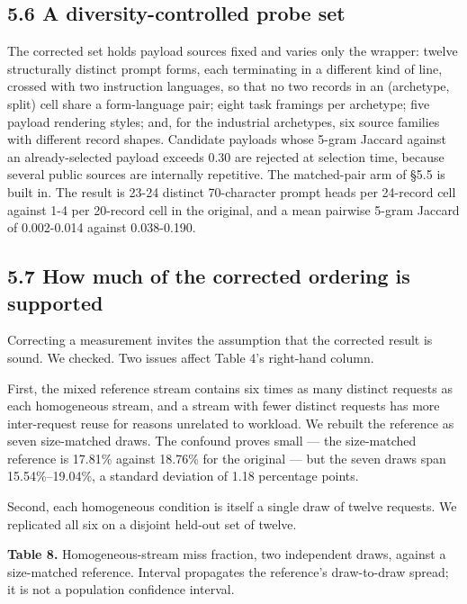 \documentclass[
  10pt,
  letterpaper,
  10pt]{article}
\begin{document}
\subsection{5.6 A diversity-controlled probe
set}\label{a-diversity-controlled-probe-set}

The corrected set holds payload sources fixed and varies only the
wrapper: twelve structurally distinct prompt forms, each terminating in
a different kind of line, crossed with two instruction languages, so
that no two records in an (archetype, split) cell share a form-language
pair; eight task framings per archetype; five payload rendering styles;
and, for the industrial archetypes, six source families with different
record shapes. Candidate payloads whose 5-gram Jaccard against an
already-selected payload exceeds 0.30 are rejected at selection time,
because several public sources are internally repetitive. The
matched-pair arm of §5.5 is built in. The result is 23-24 distinct
70-character prompt heads per 24-record cell against 1-4 per 20-record
cell in the original, and a mean pairwise 5-gram Jaccard of 0.002-0.014
against 0.038-0.190.

\subsection{5.7 How much of the corrected ordering is
supported}\label{how-much-of-the-corrected-ordering-is-supported}

Correcting a measurement invites the assumption that the corrected
result is sound. We checked. Two issues affect Table 4's right-hand
column.

First, the mixed reference stream contains six times as many distinct
requests as each homogeneous stream, and a stream with fewer distinct
requests has more inter-request reuse for reasons unrelated to workload.
We rebuilt the reference as seven size-matched draws. The confound
proves small --- the size-matched reference is 17.81\% against 18.76\%
for the original --- but the seven draws span 15.54\%--19.04\%, a
standard deviation of 1.18 percentage points.

Second, each homogeneous condition is itself a single draw of twelve
requests. We replicated all six on a disjoint held-out set of twelve.

\textbf{Table 8.} Homogeneous-stream miss fraction, two independent
draws, against a size-matched reference. Interval propagates the
reference's draw-to-draw spread; it is not a population confidence
interval.
\end{document}
